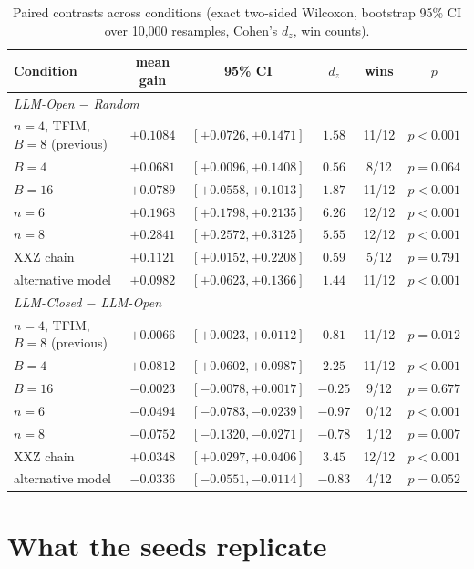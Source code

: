 \documentclass[11pt]{article}
\begin{document}
\begin{table}[t]
\centering\small
\caption{Paired contrasts across conditions (exact two-sided Wilcoxon,
bootstrap 95\% CI over 10{,}000 resamples, Cohen's $d_z$, win counts).}
\label{tab:robustness-contrasts}
\begin{tabular}{lccccc}
\toprule
Condition & mean gain & 95\% CI & $d_z$ & wins & $p$ \\
\midrule
\multicolumn{6}{l}{\textit{LLM-Open $-$ Random}}\\
$n{=}4$, TFIM, $B{=}8$ (previous) & $+0.1084$ & $[+0.0726, +0.1471]$ & $1.58$ & 11/12 & $p<0.001$ \\
$B{=}4$ & $+0.0681$ & $[+0.0096, +0.1408]$ & $0.56$ & 8/12 & $p=0.064$ \\
$B{=}16$ & $+0.0789$ & $[+0.0558, +0.1013]$ & $1.87$ & 11/12 & $p<0.001$ \\
$n{=}6$ & $+0.1968$ & $[+0.1798, +0.2135]$ & $6.26$ & 12/12 & $p<0.001$ \\
$n{=}8$ & $+0.2841$ & $[+0.2572, +0.3125]$ & $5.55$ & 12/12 & $p<0.001$ \\
XXZ chain & $+0.1121$ & $[+0.0152, +0.2208]$ & $0.59$ & 5/12 & $p=0.791$ \\
alternative model & $+0.0982$ & $[+0.0623, +0.1366]$ & $1.44$ & 11/12 & $p<0.001$ \\
\midrule
\multicolumn{6}{l}{\textit{LLM-Closed $-$ LLM-Open}}\\
$n{=}4$, TFIM, $B{=}8$ (previous) & $+0.0066$ & $[+0.0023, +0.0112]$ & $0.81$ & 11/12 & $p=0.012$ \\
$B{=}4$ & $+0.0812$ & $[+0.0602, +0.0987]$ & $2.25$ & 11/12 & $p<0.001$ \\
$B{=}16$ & $-0.0023$ & $[-0.0078, +0.0017]$ & $-0.25$ & 9/12 & $p=0.677$ \\
$n{=}6$ & $-0.0494$ & $[-0.0783, -0.0239]$ & $-0.97$ & 0/12 & $p<0.001$ \\
$n{=}8$ & $-0.0752$ & $[-0.1320, -0.0271]$ & $-0.78$ & 1/12 & $p=0.007$ \\
XXZ chain & $+0.0348$ & $[+0.0297, +0.0406]$ & $3.45$ & 12/12 & $p<0.001$ \\
alternative model & $-0.0336$ & $[-0.0551, -0.0114]$ & $-0.83$ & 4/12 & $p=0.052$ \\
\bottomrule
\end{tabular}
\end{table}


\section{What the seeds replicate}
\label{sec:replication}
\label{sec:warm}
\end{document}
